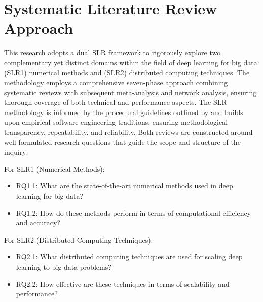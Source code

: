 \documentclass[acmsmall]{acmart}
\begin{document}
\section{Systematic Literature Review Approach}\label{sec:systematic-literature-review-approach}
This research adopts a dual SLR framework to rigorously explore two complementary yet distinct domains within the field of deep learning for big data: (SLR1) numerical methods and (SLR2) distributed computing techniques. The methodology employs a comprehensive seven-phase approach combining systematic reviews with subsequent meta-analysis and network analysis, ensuring thorough coverage of both technical and performance aspects.
The SLR methodology is informed by the procedural guidelines outlined by \citet{kitchenham2004procedures} and builds upon empirical software engineering traditions, ensuring methodological transparency, repeatability, and reliability. Both reviews are constructed around well-formulated research questions that guide the scope and structure of the inquiry:

For SLR1 (Numerical Methods):
\begin{itemize}
    \item RQ1.1: What are the state-of-the-art numerical methods used in deep learning for big data?
    \item RQ1.2: How do these methods perform in terms of computational efficiency and accuracy?
\end{itemize}
For SLR2 (Distributed Computing Techniques):
\begin{itemize}
    \item RQ2.1: What distributed computing techniques are used for scaling deep learning to big data problems?
    \item RQ2.2: How effective are these techniques in terms of scalability and performance?
\end{itemize}
\end{document}
